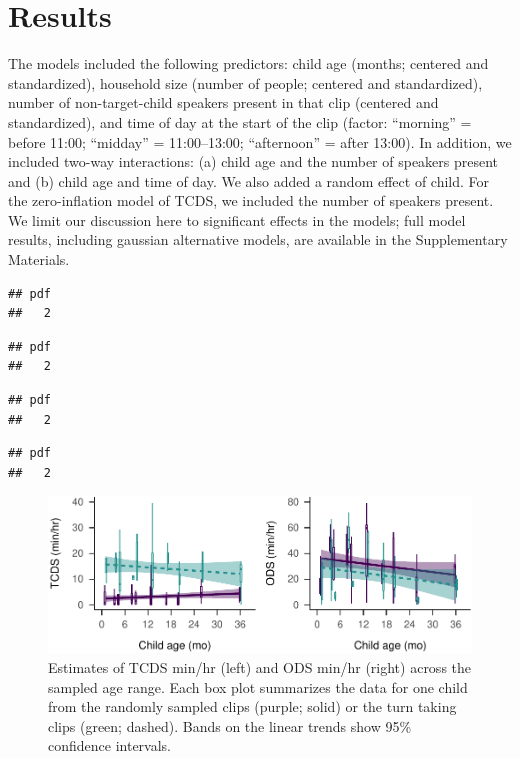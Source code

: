 \documentclass[,man,floatsintext]{apa6}
\begin{document}
\section{Results}\label{results}

The models included the following predictors: child age (months;
centered and standardized), household size (number of people; centered
and standardized), number of non-target-child speakers present in that
clip (centered and standardized), and time of day at the start of the
clip (factor: \enquote{morning} = before 11:00; \enquote{midday} =
11:00--13:00; \enquote{afternoon} = after 13:00). In addition, we
included two-way interactions: (a) child age and the number of speakers
present and (b) child age and time of day. We also added a random effect
of child. For the zero-inflation model of TCDS, we included the number
of speakers present. We limit our discussion here to significant effects
in the models; full model results, including gaussian alternative
models, are available in the Supplementary Materials.

\begin{verbatim}
## pdf 
##   2
\end{verbatim}

\begin{verbatim}
## pdf 
##   2
\end{verbatim}

\begin{verbatim}
## pdf 
##   2
\end{verbatim}

\begin{verbatim}
## pdf 
##   2
\end{verbatim}

\begin{figure}
\centering
\includegraphics{Yeli-CLE_files/figure-latex/fig3-1.pdf}
\caption{\label{fig:fig3}Estimates of TCDS min/hr (left) and ODS min/hr
(right) across the sampled age range. Each box plot summarizes the data
for one child from the randomly sampled clips (purple; solid) or the
turn taking clips (green; dashed). Bands on the linear trends show 95\%
confidence intervals.}
\end{figure}
\end{document}
